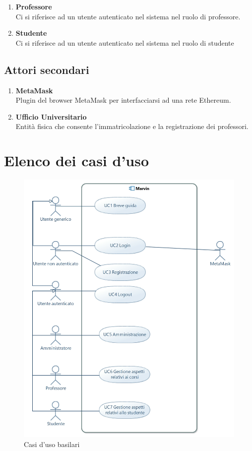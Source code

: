 \documentclass[AnalisiDeiRequisiti.tex]{subfiles}
\begin{document}
\begin{enumerate}
	\item \textbf{Professore}\\
	Ci si riferisce ad un utente autenticato nel sistema nel ruolo di professore.\\
	
	\item \textbf{Studente}\\
	Ci si riferisce ad un utente autenticato nel sistema nel ruolo di studente\\	
\end{enumerate}

\subsection{Attori secondari}
\begin{enumerate}
	\item \textbf{MetaMask}\\
	Plugin del browser MetaMask per interfacciarsi ad una rete Ethereum.\\
	
	\item \textbf{Ufficio Universitario}\\
	Entità fisica che consente l'immatricolazione e la registrazione dei professori.\\
\end{enumerate}

\section{Elenco dei casi d'uso}

\begin{figure}[h]
	\centering
	\includegraphics[width=0.8\linewidth]{UC.jpg}
	\caption{Casi d'uso basilari}
	\label{fig:Casi d'uso basilari}
\end{figure}
\end{document}
